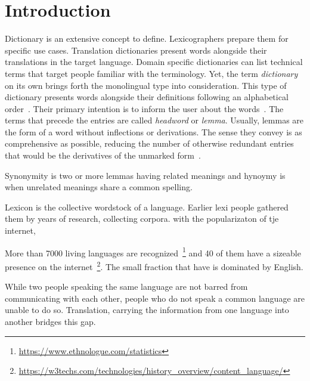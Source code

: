 \chapter{Introduction}\label{chap:introduction}%
Dictionary is an extensive concept to define.
Lexicographers prepare them for specific use cases.
Translation dictionaries present words alongside their translations in the target language.
Domain specific dictionaries can list technical terms that target people familiar with the terminology.
Yet, the term \emph{dictionary} on its own brings forth the monolingual type into consideration.
This type of dictionary presents words alongside their definitions following an alphabetical order~\cite{sterkenburg_practical_2003}.
Their primary intention is to inform the user about the words~\cite{uzun_modern_2005}.
The terms that precede the entries are called \emph{headword} or \emph{lemma}.
Usually, lemmas are the form of a word without inflections or derivations.
The sense they convey is as comprehensive as possible, reducing the number of otherwise redundant entries that would be the derivatives of the unmarked form~\cite{ibrahim_usta_turkce_2006}.

Synonymity is two or more lemmas having related meanings and hynoymy is when unrelated meanings share a common spelling.

Lexicon is the collective wordstock of a language.
Earlier lexi people gathered them by years of research, collecting corpora.
with the popularizaton of tje internet,

More than 7000 living languages are recognized~\footnote{\url{https://www.ethnologue.com/statistics}} and 40 of them have a sizeable presence on the internet~\footnote{\url{https://w3techs.com/technologies/history_overview/content_language/}}.
The small fraction that have is dominated by English.

While two people speaking the same language are not barred from communicating with each other, people who do not speak a common language are unable to do so.
Translation, carrying the information from one language into another bridges this gap.

